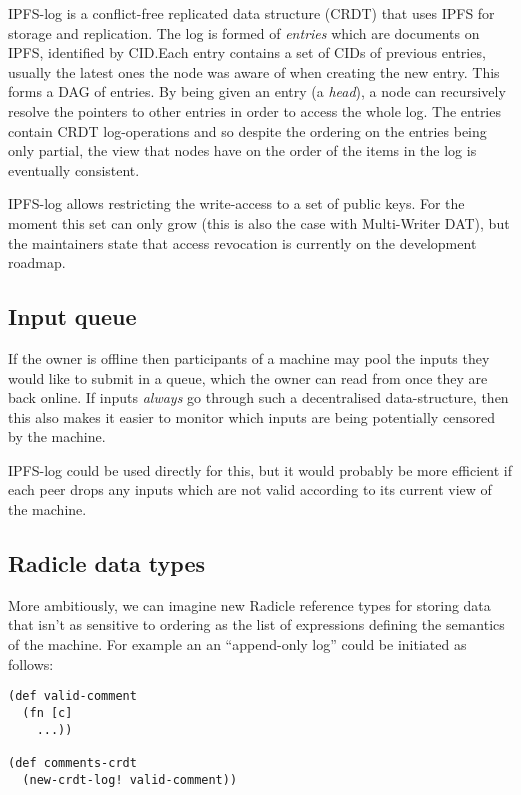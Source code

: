 \documentclass[a4paper, oneside, 10pt]{amsart}
\begin{document}
IPFS-log is a conflict-free replicated data structure (CRDT) that uses IPFS for
storage and replication. The log is formed of \emph{entries} which are documents
on IPFS, identified by CID.\@ Each entry contains a set of CIDs of previous
entries, usually the latest ones the node was aware of when creating the new
entry. This forms a DAG of entries. By being given an entry (a \emph{head}), a
node can recursively resolve the pointers to other entries in order to access
the whole log. The entries contain CRDT log-operations and so despite the
ordering on the entries being only partial, the view that nodes have on the
order of the items in the log is eventually consistent.

IPFS-log allows restricting the write-access to a set of public keys. For the
moment this set can only grow (this is also the case with Multi-Writer DAT), but
the maintainers state that access revocation is currently on the development
roadmap.

\subsection{Input queue}

If the owner is offline then participants of a machine may pool the inputs they
would like to submit in a queue, which the owner can read from once they are
back online. If inputs \emph{always} go through such a decentralised
data-structure, then this also makes it easier to monitor which inputs are being
potentially censored by the machine.

IPFS-log could be used directly for this, but it would probably be more
efficient if each peer drops any inputs which are not valid according to its
current view of the machine.

\subsection{Radicle data types}

More ambitiously, we can imagine new Radicle reference types for storing data
that isn't as sensitive to ordering as the list of expressions defining the
semantics of the machine. For example an an ``append-only log'' could be
initiated as follows:

\begin{lstlisting}
(def valid-comment
  (fn [c]
    ...))
  
(def comments-crdt
  (new-crdt-log! valid-comment))
\end{lstlisting}
\end{document}

